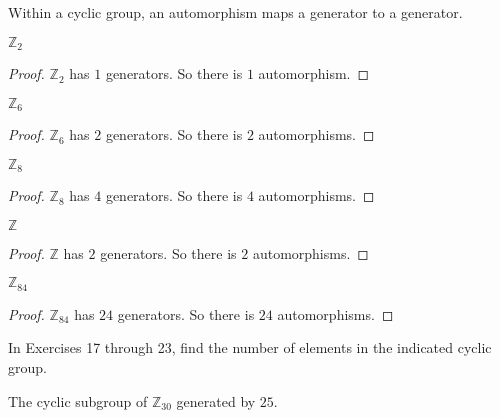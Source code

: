 Within a cyclic group, an automorphism maps a generator to a generator.

\newpage
\begin{exercise}
    $\mathbb{Z}_{2}$
\end{exercise}

\begin{proof}
    $\mathbb{Z}_{2}$ has $1$ generators. So there is $1$ automorphism.
\end{proof}

\newpage
\begin{exercise}
    $\mathbb{Z}_{6}$
\end{exercise}

\begin{proof}
    $\mathbb{Z}_{6}$ has $2$ generators. So there is $2$ automorphisms.
\end{proof}

\newpage
\begin{exercise}
    $\mathbb{Z}_{8}$
\end{exercise}

\begin{proof}
    $\mathbb{Z}_{8}$ has $4$ generators. So there is $4$ automorphisms.
\end{proof}

\newpage
\begin{exercise}
    $\mathbb{Z}$
\end{exercise}

\begin{proof}
    $\mathbb{Z}$ has $2$ generators. So there is $2$ automorphisms.
\end{proof}

\newpage
\begin{exercise}
    $\mathbb{Z}_{84}$
\end{exercise}

\begin{proof}
    $\mathbb{Z}_{84}$ has $24$ generators. So there is $24$ automorphisms.
\end{proof}

In Exercises 17 through 23, find the number of elements in the indicated cyclic group.

\newpage
\begin{exercise}
    The cyclic subgroup of $\mathbb{Z}_{30}$ generated by $25$.
\end{exercise}

